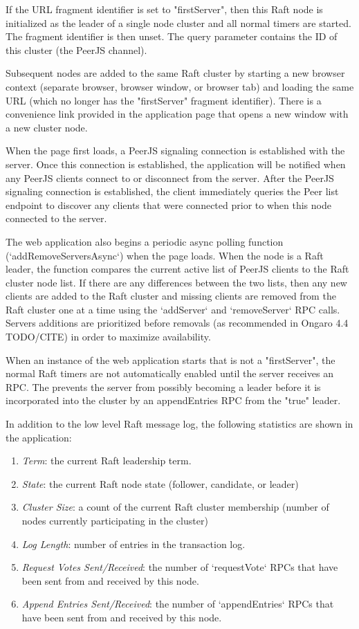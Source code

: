 \documentclass{acmtog} %
\begin{document}
If the URL fragment identifier is set to "firstServer", then this Raft
node is initialized as the leader of a single node cluster and all
normal timers are started. The fragment identifier is then unset. The
query parameter contains the ID of this cluster (the PeerJS channel).

Subsequent nodes are added to the same Raft cluster by starting a new
browser context (separate browser, browser window, or browser tab) and
loading the same URL (which no longer has the "firstServer" fragment
identifier). There is a convenience link provided in the application
page that opens a new window with a new cluster node.

When the page first loads, a PeerJS signaling connection is
established with the server. Once this connection is established, the
application will be notified when any PeerJS clients connect to or
disconnect from the server. After the PeerJS signaling connection is
established, the client immediately queries the Peer list endpoint to
discover any clients that were connected prior to when this node
connected to the server.

The web application also begins a periodic async polling function
(`addRemoveServersAsync`) when the page loads. When the node is a Raft
leader, the function compares the current active list of PeerJS clients to
the Raft cluster node list. If there are any differences between the
two lists, then any new clients are added to the Raft cluster and
missing clients are removed from the Raft cluster one at a time using
the `addServer` and `removeServer` RPC calls. Servers additions are
prioritized before removals (as recommended in Ongaro 4.4 TODO/CITE)
in order to maximize availability.

When an instance of the web application starts that is not
a "firstServer", the normal Raft timers are not automatically enabled
until the server receives an RPC. The prevents the server from
possibly becoming a leader before it is incorporated into the cluster
by an appendEntries RPC from the "true" leader.

In addition to the low level Raft message log, the following
statistics are shown in the application:

\begin{enumerate}
\item \emph{Term}: the current Raft leadership term.
\item \emph{State}: the current Raft node state (follower, candidate, or leader)
\item \emph{Cluster Size}: a count of the current Raft cluster membership (number of nodes currently participating in the cluster)
\item \emph{Log Length}: number of entries in the transaction log.
\item \emph{Request Votes Sent/Received}: the number of `requestVote` RPCs that have been sent from and received by this node.
\item \emph{Append Entries Sent/Received}: the number of `appendEntries` RPCs that have been sent from and received by this node.
\end{enumerate}
\end{document}
